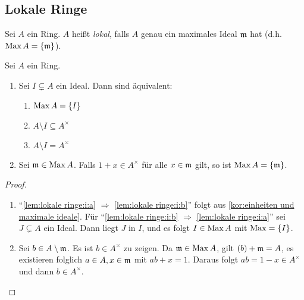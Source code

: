 \documentclass[12pt,a4paper]{scrartcl}
\theoremstyle{cplain}
\theoremstyle{cdef}
\begin{document}
\subsection{Lokale Ringe}
\begin{defi} \label{def1.5}
	Sei $A$ ein Ring. $A$ heißt \emph{lokal}, falls $A$ genau ein maximales Ideal $\mathfrak{m}$ hat (d.h. $\operatorname{Max} A = \{\mathfrak{m}\}$).
\end{defi}
\begin{lem} \label{lem:lokale ringe}
	Sei $A$ ein Ring.
	\begin{enumerate}
		\item \label{lem:lokale ringe:i} Sei $I \subsetneq A$ ein Ideal. Dann sind äquivalent:
		      \begin{enumerate}
			      \item $\operatorname{Max} A = \{I\}$ \label{lem:lokale ringe:i:a}
			      \item $A \setminus I \subseteq A^{\times}$ \label{lem:lokale ringe:i:b}
			      \item $A \setminus I = A^{\times}$ \label{lem:lokale ringe:i:c}
		      \end{enumerate}
		\item \label{lem:lokale ringe:ii} Sei $\mathfrak{m} \in \operatorname{Max} A$. Falls $1+x \in A^{\times}$ für alle $x \in \mathfrak{m}$ gilt, so ist $\operatorname{Max} A=\{ \mathfrak{m} \}$.
	\end{enumerate}
    \begin{proof}
        \leavevmode
		\begin{enumerate}[label=\ref{lem:lokale ringe:\roman*}]
			\item \enquote{\ref{lem:lokale ringe:i:a} $\Rightarrow$ \ref{lem:lokale ringe:i:b}} folgt aus \cref{kor:einheiten und maximale ideale}. Für \enquote{\ref{lem:lokale ringe:i:b} $\Rightarrow$ \ref{lem:lokale ringe:i:a}} sei $J \subsetneq A$ ein Ideal. Dann liegt $J$ in $I$, und es folgt $I \in \operatorname{Max} A$ mit $\operatorname{Max} = \{I\}$.
			\item Sei $b \in A \setminus \mathfrak{m}$. Es ist $b \in A^{\times}$ zu zeigen. Da $\mathfrak{m} \in \operatorname{Max} A$, gilt $(b)+\mathfrak{m}=A$, es existieren folglich $a \in A, x\in \mathfrak{m}$ mit $ab+x=1$. Daraus folgt $ab=1-x \in A^{\times}$ und dann $b \in A^{\times}$.
            \qedhere
        \end{enumerate}
	\end{proof}
\end{lem}
\end{document}
